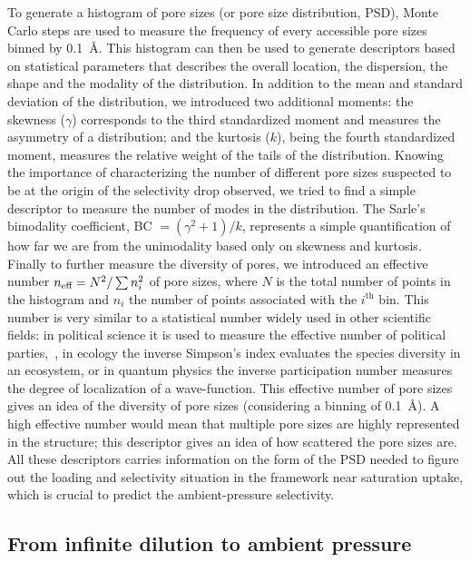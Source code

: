 \documentclass[main]{subfiles}
\begin{document}
To generate a histogram of pore sizes (or pore size distribution, PSD), Monte Carlo steps are used to measure the frequency of every accessible pore sizes binned by \SI{0.1}{\angstrom}.\cite{poresize_Pinheiro2013} This histogram can then be used to generate descriptors based on statistical parameters that describes the overall location, the dispersion, the shape and the modality of the distribution. In addition to the mean and standard deviation of the distribution, we introduced two additional moments: the skewness ($\gamma$) corresponds to the third standardized moment and measures the asymmetry of a distribution; and the kurtosis ($k$), being the fourth standardized moment, measures the relative weight of the tails of the distribution. Knowing the importance of characterizing the number of different pore sizes suspected to be at the origin of the selectivity drop observed, we tried to find a simple descriptor to measure the number of modes in the distribution. The Sarle's bimodality coefficient, BC $= (\gamma^2 +1)/k$, represents a simple quantification of how far we are from the unimodality based only on skewness and kurtosis.\cite{Tarba_2022}
Finally to further measure the diversity of pores, we introduced an effective number $n_{\text{eff}} = N^2/\sum n_i^2$ of pore sizes, where $N$ is the total number of points in the histogram and $n_i$ the number of points associated with the $i^\text{th}$ bin. This number is very similar to a statistical number widely used in other scientific fields: in political science it is used to measure the effective number of political parties,~\cite{neffposci_Laakso1979}, in ecology the inverse Simpson's index evaluates the species diversity in an ecosystem,\cite{neffbio_Simpson1949} or in quantum physics the inverse participation number measures the degree of localization of a wave-function.\cite{neffphys_Kramer1993} This effective number of pore sizes gives an idea of the diversity of pore sizes (considering a binning of \SI{0.1}{\angstrom}). A high effective number would mean that multiple pore sizes are highly represented in the structure; this descriptor gives an idea of how scattered the pore sizes are.
All these descriptors carries information on the form of the PSD needed to figure out the loading and selectivity situation in the framework near saturation uptake, which is crucial to predict the ambient-pressure selectivity.

\subsection{From infinite dilution to ambient pressure}
\end{document}
